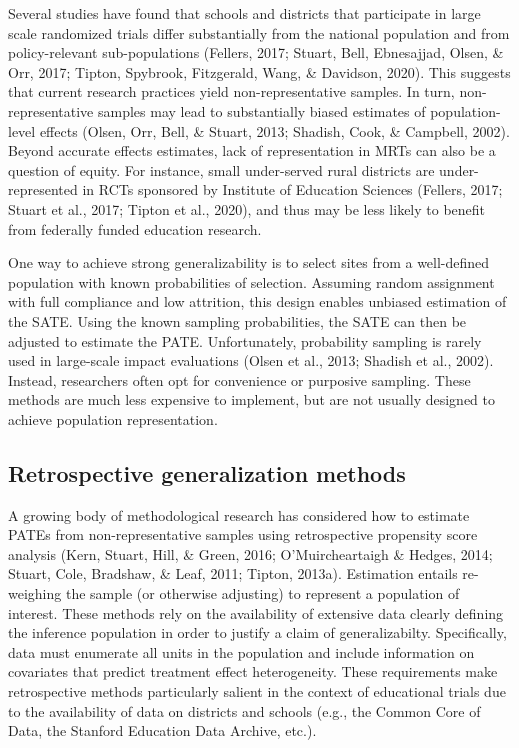 \documentclass[
  english,
  man,floatsintext]{apa6}
\begin{document}
Several studies have found that schools and districts that participate in large scale randomized trials differ substantially from the national population and from policy-relevant sub-populations (Fellers, 2017; Stuart, Bell, Ebnesajjad, Olsen, \& Orr, 2017; Tipton, Spybrook, Fitzgerald, Wang, \& Davidson, 2020). This suggests that current research practices yield non-representative samples. In turn, non-representative samples may lead to substantially biased estimates of population-level effects (Olsen, Orr, Bell, \& Stuart, 2013; Shadish, Cook, \& Campbell, 2002). Beyond accurate effects estimates, lack of representation in MRTs can also be a question of equity. For instance, small under-served rural districts are under-represented in RCTs sponsored by Institute of Education Sciences (Fellers, 2017; Stuart et al., 2017; Tipton et al., 2020), and thus may be less likely to benefit from federally funded education research.

One way to achieve strong generalizability is to select sites from a well-defined population with known probabilities of selection. Assuming random assignment with full compliance and low attrition, this design enables unbiased estimation of the SATE. Using the known sampling probabilities, the SATE can then be adjusted to estimate the PATE. Unfortunately, probability sampling is rarely used in large-scale impact evaluations (Olsen et al., 2013; Shadish et al., 2002). Instead, researchers often opt for convenience or purposive sampling. These methods are much less expensive to implement, but are not usually designed to achieve population representation.

\hypertarget{retrospective-generalization-methods}{%
\subsection{Retrospective generalization methods}\label{retrospective-generalization-methods}}

A growing body of methodological research has considered how to estimate PATEs from non-representative samples using retrospective propensity score analysis (Kern, Stuart, Hill, \& Green, 2016; O'Muircheartaigh \& Hedges, 2014; Stuart, Cole, Bradshaw, \& Leaf, 2011; Tipton, 2013a). Estimation entails re-weighing the sample (or otherwise adjusting) to represent a population of interest.
These methods rely on the availability of extensive data clearly defining the inference population in order to justify a claim of generalizabilty. Specifically, data must enumerate all units in the population and include information on covariates that predict treatment effect heterogeneity. These requirements make retrospective methods particularly salient in the context of educational trials due to the availability of data on districts and schools (e.g., the Common Core of Data, the Stanford Education Data Archive, etc.).
\end{document}
